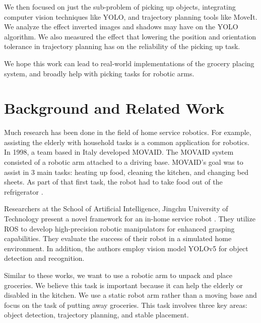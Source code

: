 \documentclass{article}
\begin{document}
We then focused on just the sub-problem of picking up objects, integrating computer vision techniques like YOLO, and trajectory planning tools like MoveIt. We analyze the effect inverted images and shadows may have on the YOLO algorithm. We also measured the effect that lowering the position and orientation tolerance in trajectory planning has on the reliability of the picking up task.

We hope this work can lead to real-world implementations of the grocery placing system, and broadly help with picking tasks for robotic arms.


\section{Background and Related Work}





Much research has been done in the field of home service robotics. For example, assisting the elderly with household tasks is a common application for robotics. In 1998, a team based in Italy developed MOVAID. The MOVAID system consisted of a robotic arm attached to a driving base. MOVAID's goal was to assist in 3 main tasks: heating up food, cleaning the kitchen, and changing bed sheets. As part of that first task, the robot had to take food out of the refrigerator \cite{doi:10.3233/TAD-1999-10202}. 

Researchers at the School of Artificial Intelligence, Jingchu University of Technology present a novel framework for an in-home service robot \cite{11179321}. They utilize ROS to develop high-precision robotic manipulators
for enhanced grasping capabilities. They evaluate the success of their robot in a simulated home environment. In addition, the authors employ vision model YOLOv5 for object detection and recognition.

Similar to these works, we want to use a robotic arm to unpack and place groceries. We believe this task is important because it can help the elderly or disabled in the kitchen. We use a static robot arm rather than a moving base and focus on the task of putting away groceries. This task involves three key areas: object detection, trajectory planning, and stable placement.
\end{document}
